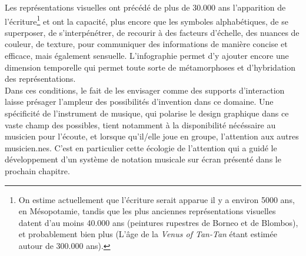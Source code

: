 \indent Les représentations visuelles ont précédé de plus de 30.000 ans l'apparition de l'écriture\footnote{On estime actuellement que l'écriture serait apparue il y a environ 5000 ans, en Mésopotamie, tandis que les plus anciennes représentations visuelles datent d'au moins 40.000 ans (peintures rupestres de Borneo et de Blombos), et probablement bien plus (L'âge de la \textit{Venus of Tan-Tan} étant estimée autour de 300.000 ans).} et ont la capacité, plus encore que les symboles alphabétiques, de se superposer, de s'interpénétrer, de recourir à des facteurs d'échelle, des nuances de couleur, de texture, pour communiquer des informations de manière concise et efficace, mais également sensuelle. L'infographie permet d'y ajouter encore une dimension temporelle qui permet toute sorte de métamorphoses et d'hybridation des représentations.\\
\indent Dans ces conditions, le fait de les envisager comme des supports d'interaction laisse présager l'ampleur des possibilités d'invention dans ce domaine. Une spécificité de l'instrument de musique, qui polarise le design graphique dans ce vaste champ des possibles, tient notamment à la disponibilité nécéssaire au musicien pour l'écoute, et lorsque qu'il/elle joue en groupe, l'attention aux autres musicien.nes. C'est en particulier cette écologie de l'attention qui a guidé le développement d'un système de notation musicale sur écran présenté dans le prochain chapitre.









